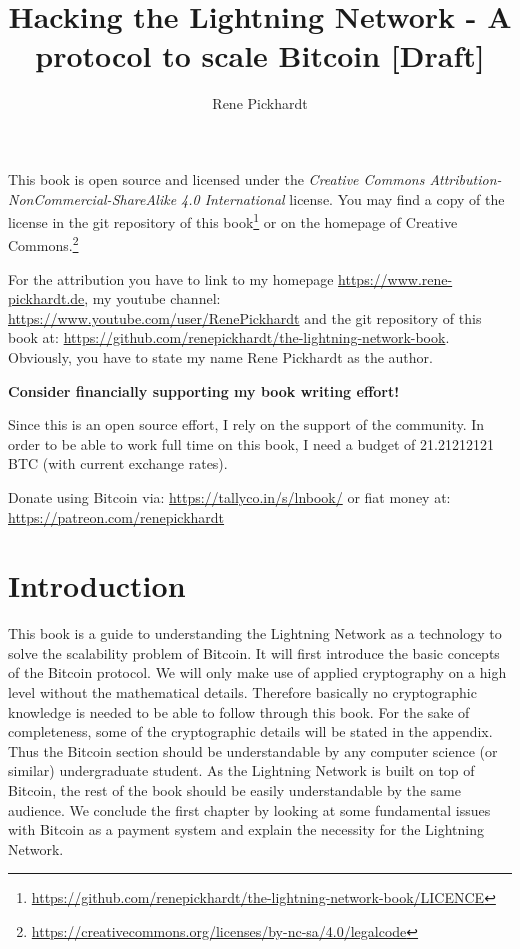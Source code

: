 \documentclass[a4paper,12pt,oneside,openany]{book}
\title{Hacking the Lightning Network - A protocol to scale Bitcoin [Draft]}
\author{Rene Pickhardt}
\begin{document}
\maketitle

\newpage
This book is open source and licensed under the \textit{Creative Commons Attribution-NonCommercial-ShareAlike 4.0 International} license. You may find a copy of the license in the git repository of this book\footnote{\url{https://github.com/renepickhardt/the-lightning-network-book/LICENCE}} or on the homepage of Creative Commons.\footnote{\url{https://creativecommons.org/licenses/by-nc-sa/4.0/legalcode}}

For the attribution you have to link to my homepage \url{https://www.rene-pickhardt.de}, my youtube channel: \url{https://www.youtube.com/user/RenePickhardt} and the git repository of this book at: \url{https://github.com/renepickhardt/the-lightning-network-book}. Obviously, you have to state my name Rene Pickhardt as the author.

\textbf{Consider financially supporting my book writing effort!}

Since this is an open source effort, I rely on the support of the community. In order to be able to work full time on this book, I need a budget of 21.21212121 BTC (with current exchange rates).

Donate using Bitcoin via: \url{https://tallyco.in/s/lnbook/} or fiat money at:  \url{https://patreon.com/renepickhardt}

\newpage
\tableofcontents
\newpage

\newcommand{\problem}[1]{\textbf{Problem: #1}}
\newcommand{\todo}[1]{\textcolor{blue}{\textbf{TODO}: #1}}

\newtheorem{theorem}{Theorem}[chapter]
\newtheorem{lemma}{Lemma}[chapter]
\theoremstyle{remark}
\newtheorem{remark}{Remark}[chapter]
\theoremstyle{definition}
\newtheorem{definition}{Definition}[chapter]
\theoremstyle{remark}
\newtheorem{example}{Example}[chapter]

\chapter{Introduction}
This book is a guide to understanding the Lightning Network as a technology to solve the scalability problem of Bitcoin.
It will first introduce the basic concepts of the Bitcoin protocol.
We will only make use of applied cryptography on a high level without the mathematical details.
Therefore basically no cryptographic knowledge is needed to be able to follow through this book.
For the sake of completeness, some of the cryptographic details will be stated in the appendix.
Thus the Bitcoin section should be understandable by any computer science (or similar) undergraduate student.
As the Lightning Network is built on top of Bitcoin, the rest of the book should be easily understandable by the same audience.
We conclude the first chapter by looking at some fundamental issues with Bitcoin as a payment system and explain the necessity for the Lightning Network.
\end{document}
